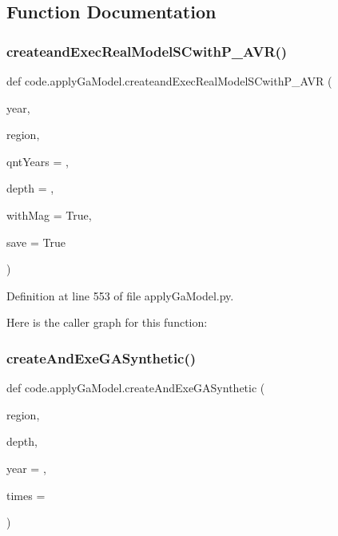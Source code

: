 \subsection{Function Documentation}
\mbox{\label{namespacecode_1_1apply_ga_model_a6b580b2078c64bf88da378552a3eb142}} 
\subsubsection{\texorpdfstring{createand\+Exec\+Real\+Model\+S\+Cwith\+P\+\_\+\+A\+V\+R()}{createandExecRealModelSCwithP\_AVR()}}
{\footnotesize\ttfamily def code.\+apply\+Ga\+Model.\+createand\+Exec\+Real\+Model\+S\+Cwith\+P\+\_\+\+A\+VR (\begin{DoxyParamCaption}\item[{}]{year,  }\item[{}]{region,  }\item[{}]{qnt\+Years = {},  }\item[{}]{depth = {},  }\item[{}]{with\+Mag = {\ttfamily True},  }\item[{}]{save = {\ttfamily True} }\end{DoxyParamCaption})}



Definition at line 553 of file apply\+Ga\+Model.\+py.

Here is the caller graph for this function\+:
\mbox{\label{namespacecode_1_1apply_ga_model_a94f1c9ee8f252ef24653366e6206e4b8}} 
\subsubsection{\texorpdfstring{create\+And\+Exe\+G\+A\+Synthetic()}{createAndExeGASynthetic()}}
{\footnotesize\ttfamily def code.\+apply\+Ga\+Model.\+create\+And\+Exe\+G\+A\+Synthetic (\begin{DoxyParamCaption}\item[{}]{region,  }\item[{}]{depth,  }\item[{}]{year = {},  }\item[{}]{times = {} }\end{DoxyParamCaption})}



